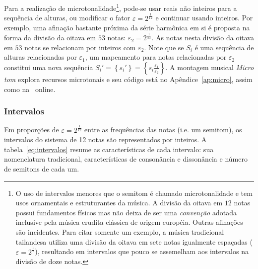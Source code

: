 Para a realização de microtonalidade\footnote{O uso de
intervalos menores que o semitom é chamado microtonalidade e tem usos
ornamentais e estruturantes da música. A
divisão da oitava em $12$ notas possui fundamentos físicos mas
não deixa de ser uma \emph{convenção}
adotada inclusive pela música erudita clássica de origem européia. Outras afinações
são incidentes. Para citar somente um exemplo, a
música tradicional tailandesa utiliza uma divisão da oitava em sete notas igualmente
espaçadas ($\varepsilon=2^{\frac{1}{7}}$),
resultando em intervalos que pouco se assemelham aos intervalos na
divisão de doze notas.\cite{Wisnick}},
pode-se usar reais não inteiros
para a sequência de alturas, ou modificar o fator $\varepsilon=2^{\frac{1}{12}}$
e continuar usando inteiros. Por exemplo, uma afinação
bastante próxima da série harmônica em si
é proposta na forma da divisão da oitava em $53$ notas:
$\varepsilon_2=2^{\frac{1}{53}}$.\cite{microtonalidade}
As notas nesta divisão da oitava em $53$ notas se relacionam por inteiros
com $\varepsilon_2$.
Note que se $S_i$ é uma sequência de alturas relacionadas por $\varepsilon_1$,
um mapeamento para notas relacionadas por $\varepsilon_2$
constitui uma nova sequência $S_i'=\left\{s_i'\right\}=\left\{ s_i \frac{\varepsilon_1}{\varepsilon_2}\right\}$. A montagem musical \emph{Micro tom} explora recursos microtonais e seu código está no Apêndice~\ref{ap:micro}, assim como na \massa\ online.



\subsubsection{Intervalos}\label{subsec:intervalos}
Em proporções de $\varepsilon=2^{\frac{1}{12}}$ entre as frequências das notas (i.e. um semitom), os intervalos do sistema de 12 notas são representados por inteiros. A tabela~\ref{eq:intervalos} resume as características de cada intervalo: sua nomenclatura tradicional, características de consonância e dissonância e número de semitons de cada um.

